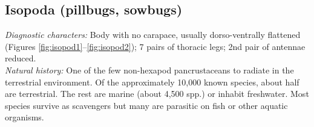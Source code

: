 \documentclass[letterpaper, 11pt]{article}
\begin{document}
\subsection{Isopoda (pillbugs, sowbugs)}
\noindent{}\textit{Diagnostic characters:} Body with no carapace, usually dorso-ventrally flattened (Figures \ref{fig:isopod1}--\ref{fig:isopod2}); 7 pairs of thoracic legs; 2nd pair of antennae reduced.\\

\noindent{}\textit{Natural history:} One of the few non-hexapod pancrustaceans to radiate in the terrestrial environment. Of the approximately 10,000 known species, about half are terrestrial. The rest are marine (about 4,500 spp.) or inhabit freshwater. Most species survive as scavengers but many are parasitic on fish or other aquatic organisms.\\
\end{document}
